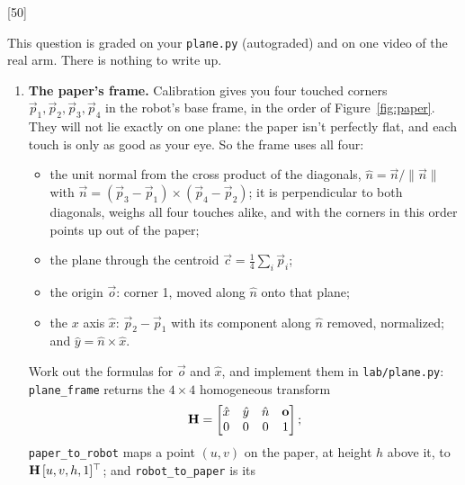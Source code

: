\documentclass{16384_doc}
\begin{document}
\begin{questions}
    \setcounter{question}{1}
    [50]

    This question is graded on your \verb!plane.py! (autograded) and on one
    video of the real arm.  There is nothing to write up.

    \begin{enumerate}[label=\alph*.]
        \item \text{[10 points]} \textbf{The paper's frame.}  Calibration gives
        you four touched corners $\vec{p}_1, \vec{p}_2, \vec{p}_3, \vec{p}_4$ in
        the robot's base frame, in the order of Figure~\ref{fig:paper}.  They
        will not lie exactly on one plane: the paper isn't perfectly flat, and
        each touch is only as good as your eye.  So the frame uses all four:
        \begin{itemize}
            \item the unit normal from the cross product of the diagonals,
                  $\hat{n} = \vec{n} / \|\vec{n}\|$ with
                  $\vec{n} = (\vec{p}_3 - \vec{p}_1) \times (\vec{p}_4 - \vec{p}_2)$;
                  it is perpendicular to both diagonals, weighs all four touches
                  alike, and with the corners in this order points up out of the
                  paper;
            \item the plane through the centroid
                  $\vec{c} = \frac{1}{4}\sum_i \vec{p}_i$;
            \item the origin $\vec{o}$: corner 1, moved along $\hat{n}$ onto that
                  plane;
            \item the $x$ axis $\hat{x}$: $\vec{p}_2 - \vec{p}_1$ with its
                  component along $\hat{n}$ removed, normalized; and
                  $\hat{y} = \hat{n} \times \hat{x}$.
        \end{itemize}
        Work out the formulas for $\vec{o}$ and $\hat{x}$, and implement them in
        \verb!lab/plane.py!: \verb!plane_frame! returns the $4 \times 4$
        homogeneous transform
        \[
            \mathbf{H} = \begin{bmatrix} \hat{x} & \hat{y} & \hat{n} & \mathbf{o} \\
                                      0 & 0 & 0 & 1 \end{bmatrix};
        \]
        \verb!paper_to_robot! maps a point $(u, v)$ on the paper, at height $h$
        above it, to $\mathbf{H}\,[u, v, h, 1]^\top$; and \verb!robot_to_paper! is its

\end{enumerate}
\end{questions}
\end{document}
